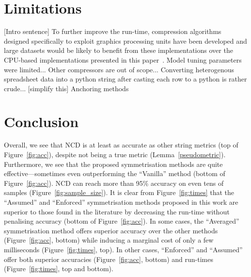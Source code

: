 \documentclass[preprint,12pt]{article}
\begin{document}
\section{Limitations}
\label{limitations}
[Intro sentence]
To further improve the run-time, compression algorithms designed specifically to exploit graphics processing units have been developed and large datasets would be likely to benefit from these implementations over the CPU-based implementations presented in this paper~\cite{gpu_compression}. 
Model tuning parameters were limited... 
Other compressors are out of scope...
Converting heterogenous spreadsheet data into a python string after casting each row to a python is rather crude... [simplify this]
Anchoring methods~\cite{anchor}




\section{Conclusion}
\label{conclusion}

Overall, we see that NCD is at least as accurate as other string metrics (top of Figure~\ref{fig:acc}), despite not being a true metric (Lemma~\ref{pseudometric}). 
Furthermore, we see that the proposed symmetrisation methods are quite effective---sometimes even outperforming the ``Vanilla'' method (bottom of Figure~\ref{fig:acc}). 
NCD can reach more than 95\% accuracy on even tens of samples (Figure~\ref{fig:sample_size}).
It is clear from Figure~\ref{fig:times} that the ``Assumed'' and ``Enforced'' symmetrisation methods proposed in this work are superior to those found in the literature by decreasing the run-time without penalising accuracy (bottom of Figure~\ref{fig:acc}).
In some cases, the ``Averaged'' symmetrisation method offers superior accuracy over the other methods (Figure~\ref{fig:acc}, bottom) while inducing a marginal cost of only a few milliseconds (Figure~\ref{fig:times}, top).
In other cases, ``Enforced'' and ``Assumed'' offer both superior accuracies (Figure~\ref{fig:acc}, bottom) and run-times (Figure~\ref{fig:times}, top and bottom).
\end{document}
